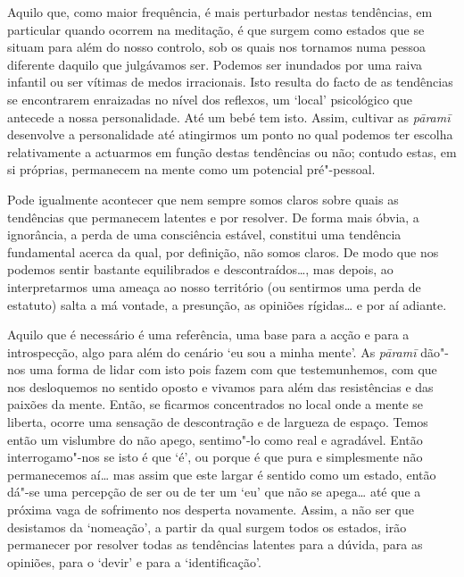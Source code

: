 Aquilo que, como maior frequência, é mais perturbador nestas tendências, em
particular quando ocorrem na meditação, é que surgem como estados que se situam
para além do nosso controlo, sob os quais nos tornamos numa pessoa diferente
daquilo que julgávamos ser. Podemos ser inundados por uma raiva infantil ou ser
vítimas de medos irracionais. Isto resulta do facto de as tendências se
encontrarem enraizadas no nível dos reflexos, um `local' psicológico que
antecede a nossa personalidade. Até um bebé tem isto.
Assim, cultivar as \emph{pāramī} desenvolve a personalidade até atingirmos um
ponto no qual podemos ter escolha relativamente a actuarmos em função destas
tendências ou não; contudo estas, em si próprias, permanecem na mente como um
potencial pré"-pessoal.

Pode igualmente acontecer que nem sempre somos claros sobre quais as tendências
que permanecem latentes e por resolver. De forma mais óbvia, a ignorância, a
perda de uma consciência estável, constitui uma tendência fundamental acerca da
qual, por definição, não somos claros. De modo que nos podemos sentir bastante
equilibrados e descontraídos\ldots{}, mas depois, ao interpretarmos uma ameaça
ao nosso território (ou sentirmos uma perda de estatuto) salta a má vontade, a
presunção, as opiniões rígidas\ldots{} e por aí adiante.

Aquilo que é necessário é uma referência, uma base para a acção e para a
introspecção, algo para além do cenário `eu sou a minha mente'. As \emph{pāramī}
dão"-nos uma forma de lidar com isto pois fazem com que testemunhemos, com que
nos desloquemos no sentido oposto e vivamos para além das resistências e das
paixões da mente. Então, se ficarmos concentrados no local onde a mente se
liberta, ocorre uma sensação de descontração e de largueza de espaço. Temos
então um vislumbre do não apego, sentimo"-lo como real e agradável. Então
interrogamo"-nos se isto é que `é', ou porque é que pura e simplesmente não
permanecemos aí\ldots{} mas assim que este largar é sentido como um estado,
então dá"-se uma percepção de ser ou de ter um `eu' que não se apega\ldots{} até
que a próxima vaga de sofrimento nos desperta novamente. Assim, a não ser que
desistamos da `nomeação', a partir da qual surgem todos os estados, irão
permanecer por resolver todas as tendências latentes para a dúvida, para as
opiniões, para o `devir' e para a `identificação'.

